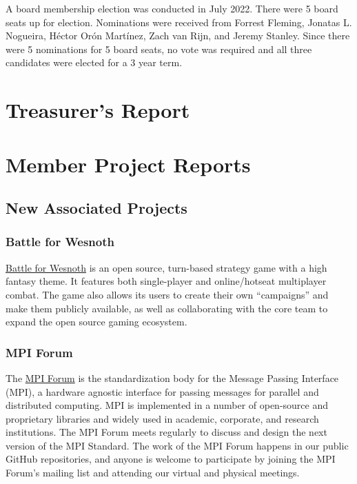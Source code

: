 \documentclass[a4paper]{report}
\begin{document}
A board membership election was conducted in July 2022.  There were 5 board seats up for election.  Nominations were received from Forrest Fleming, Jonatas L. Nogueira, Héctor Orón Martínez, Zach van Rijn, and Jeremy Stanley.  Since there were 5 nominations for 5 board seats, no vote was required and all three candidates were elected for a 3 year term.

\chapter{Treasurer's Report}

\chapter{Member Project Reports}

\section{New Associated Projects}

\subsection{Battle for Wesnoth}

\href{https://www.wesnoth.org/}{Battle for Wesnoth} is an open source, turn-based strategy game with a high fantasy theme. It features both single-player and online/hotseat multiplayer combat. The game also allows its users to create their own ``campaigns'' and make them publicly available, as well as collaborating with the core team to expand the open source gaming ecosystem.

\subsection{MPI Forum}

The \href{https://www.mpi-forum.org/}{MPI Forum} is the standardization body for the Message Passing Interface (MPI), a hardware agnostic interface for passing messages for parallel and distributed computing. MPI is implemented in a number of open-source and proprietary libraries and widely used in academic, corporate, and research institutions. The MPI Forum meets regularly to discuss and design the next version of the MPI Standard. The work of the MPI Forum happens in our public GitHub repositories, and anyone is welcome to participate by joining the MPI Forum's mailing list and attending our virtual and physical meetings.
\end{document}
